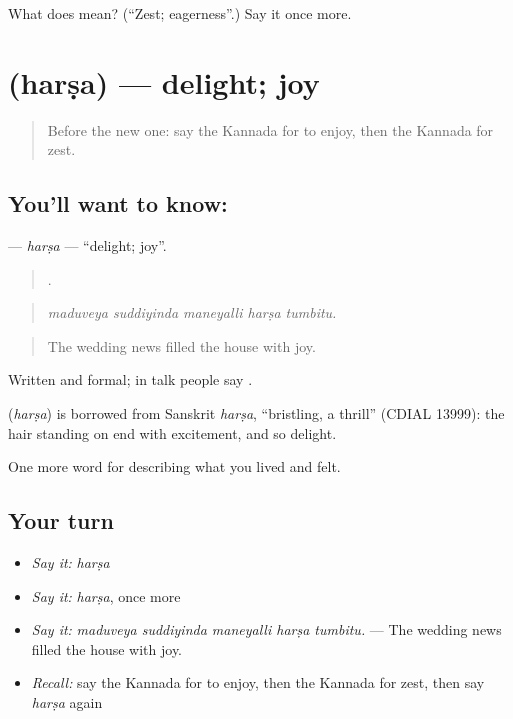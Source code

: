 \begin{tcolorbox}[breakable,colback=teal!4,colframe=teal!35!black,title={Before you move on}]
What does  mean? (\textquotedblleft{}Zest; eagerness\textquotedblright{}.) Say it once more.
\end{tcolorbox}
\section[\texorpdfstring{\kn{ಹರ್ಷ} (harṣa)}{ಹರ್ಷ (harṣa)}]{ (harṣa) — delight; joy}

\label{lesson:KA-C492-harsa}



\begin{quote}
Before the new one: say the Kannada for to enjoy, then the Kannada for zest.
\end{quote}

\subsection*{You'll want to know: }
\textbf{} — \emph{harṣa} — \textquotedblleft{}delight; joy\textquotedblright{}.

\begin{quote}
    .
\end{quote}

\begin{quote}
\emph{maduveya suddiyinda maneyalli harṣa tumbitu.}
\end{quote}

\begin{quote}
The wedding news filled the house with joy.
\end{quote}

Written and formal; in talk people say .

\begin{cousinweb}
\textbf{} (\emph{harṣa}) is borrowed from Sanskrit \emph{harṣa}, \textquotedblleft{}bristling, a thrill\textquotedblright{} (CDIAL 13999): the hair standing on end with excitement, and so delight.
\end{cousinweb}

\begin{grammarlens}[title={What you've built}]
One more word for describing what you lived and felt.
\end{grammarlens}

\subsection*{Your turn}
\begin{itemize}
\raggedright
  \item \emph{Say it:} \emph{harṣa}
  \item \emph{Say it:} \emph{harṣa}, once more
  \item \emph{Say it:} \emph{maduveya suddiyinda maneyalli harṣa tumbitu.} — The wedding news filled the house with joy.
  \item \emph{Recall:} say the Kannada for to enjoy, then the Kannada for zest, then say \emph{harṣa} again
\end{itemize}

